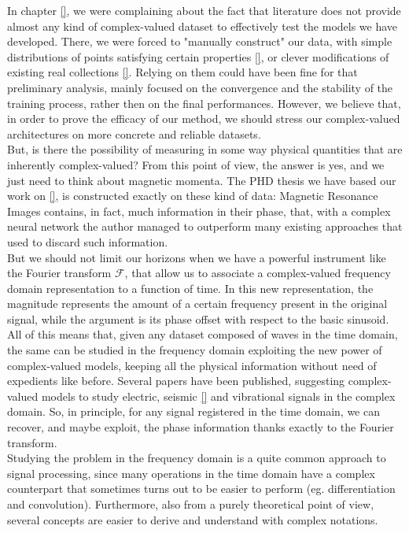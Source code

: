 \documentclass[../main.tex]{subfiles}
\begin{document}
In chapter \ref{}, we were complaining about the fact that literature does not provide almost any kind of complex-valued dataset to effectively test the models we have developed. There, we were forced to "manually construct" our data, with simple distributions of points satisfying certain properties \ref{}, or clever modifications of existing real collections \ref{}. Relying on them could have been fine for that preliminary analysis, mainly focused on the convergence and the stability of the training process, rather then on the final performances. However, we believe that, in order to prove the efficacy of our method, we should stress our complex-valued architectures on more concrete and reliable datasets.\\
But, is there the possibility of measuring in some way physical quantities that are inherently complex-valued? From this point of view, the answer is yes, and we just need to think about magnetic momenta. The PHD thesis we have based our work on \ref{}, is constructed exactly on these kind of data: Magnetic Resonance Images contains, in fact, much information in their phase, that, with a complex neural network the author managed to outperform many existing approaches that used to discard such information.\\
But we should not limit our horizons when we have a powerful instrument like the Fourier transform $\mathcal{F}$, that allow us to associate a complex-valued frequency domain representation to a function of time. In this new representation, the magnitude represents the amount of a certain frequency present in the original signal, while the argument is its phase offset with respect to the basic sinusoid. All of this means that, given any dataset composed of waves in the time domain, the same can be studied in the frequency domain exploiting the new power of complex-valued models, keeping all the physical information without need of expedients like before. Several papers have been published, suggesting complex-valued models to study electric, seismic \ref{} and vibrational signals in the complex domain. So, in principle, for any signal registered in the time domain, we can recover, and maybe exploit, the phase information thanks exactly to the Fourier transform.\\
Studying the problem in the frequency domain is a quite common approach to signal processing, since many operations in the time domain have a complex counterpart that sometimes turns out to be easier to perform (eg. differentiation and convolution). Furthermore, also from a purely theoretical point of view, several concepts are easier to derive and understand with complex notations.
\end{document}
